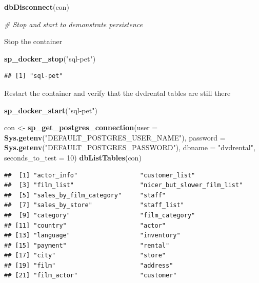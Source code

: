 \documentclass[]{book}
\newenvironment{Shaded}{\begin{snugshade}}{\end{snugshade}}
\newcommand{\CommentTok}[1]{\textcolor[rgb]{0.56,0.35,0.01}{\textit{#1}}}
\newcommand{\DataTypeTok}[1]{\textcolor[rgb]{0.13,0.29,0.53}{#1}}
\newcommand{\DecValTok}[1]{\textcolor[rgb]{0.00,0.00,0.81}{#1}}
\newcommand{\KeywordTok}[1]{\textcolor[rgb]{0.13,0.29,0.53}{\textbf{#1}}}
\newcommand{\NormalTok}[1]{#1}
\newcommand{\StringTok}[1]{\textcolor[rgb]{0.31,0.60,0.02}{#1}}
\theoremstyle{definition}
\theoremstyle{definition}
\theoremstyle{definition}
\theoremstyle{remark}
\begin{document}
\begin{Shaded}
\begin{Highlighting}[]
\KeywordTok{dbDisconnect}\NormalTok{(con)}

\CommentTok{# Stop and start to demonstrate persistence}
\end{Highlighting}
\end{Shaded}

Stop the container

\begin{Shaded}
\begin{Highlighting}[]
\KeywordTok{sp_docker_stop}\NormalTok{(}\StringTok{"sql-pet"}\NormalTok{)}
\end{Highlighting}
\end{Shaded}

\begin{verbatim}
## [1] "sql-pet"
\end{verbatim}

Restart the container and verify that the dvdrental tables are still
there

\begin{Shaded}
\begin{Highlighting}[]
\KeywordTok{sp_docker_start}\NormalTok{(}\StringTok{"sql-pet"}\NormalTok{)}

\NormalTok{con <-}\StringTok{ }\KeywordTok{sp_get_postgres_connection}\NormalTok{(}\DataTypeTok{user =} \KeywordTok{Sys.getenv}\NormalTok{(}\StringTok{"DEFAULT_POSTGRES_USER_NAME"}\NormalTok{),}
                                  \DataTypeTok{password =} \KeywordTok{Sys.getenv}\NormalTok{(}\StringTok{"DEFAULT_POSTGRES_PASSWORD"}\NormalTok{),}
                                  \DataTypeTok{dbname =} \StringTok{"dvdrental"}\NormalTok{,}
                                  \DataTypeTok{seconds_to_test =} \DecValTok{10}\NormalTok{)}
\KeywordTok{dbListTables}\NormalTok{(con)}
\end{Highlighting}
\end{Shaded}

\begin{verbatim}
##  [1] "actor_info"                 "customer_list"             
##  [3] "film_list"                  "nicer_but_slower_film_list"
##  [5] "sales_by_film_category"     "staff"                     
##  [7] "sales_by_store"             "staff_list"                
##  [9] "category"                   "film_category"             
## [11] "country"                    "actor"                     
## [13] "language"                   "inventory"                 
## [15] "payment"                    "rental"                    
## [17] "city"                       "store"                     
## [19] "film"                       "address"                   
## [21] "film_actor"                 "customer"
\end{verbatim}
\end{document}
